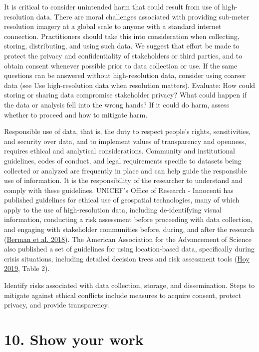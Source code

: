 \documentclass[
  12pt,
]{article}
\begin{document}
It is critical to consider unintended harm that could result from use of
high-resolution data. There are moral challenges associated with
providing sub-meter resolution imagery at a global scale to anyone with
a standard internet connection. Practitioners should take this into
consideration when collecting, storing, distributing, and using such
data. We suggest that effort be made to protect the privacy and
confidentiality of stakeholders or third parties, and to obtain consent
whenever possible prior to data collection or use. If the same questions
can be answered without high-resolution data, consider using coarser
data (see Use high-resolution data when resolution matters). Evaluate:
How could storing or sharing data compromise stakeholder privacy? What
could happen if the data or analysis fell into the wrong hands? If it
could do harm, assess whether to proceed and how to mitigate harm.

Responsible use of data, that is, the duty to respect people's rights,
sensitivities, and security over data, and to implement values of
transparency and openness, requires ethical and analytical
considerations. Community and institutional guidelines, codes of
conduct, and legal requirements specific to datasets being collected or
analyzed are frequently in place and can help guide the responsible use
of information. It is the responsibility of the researcher to understand
and comply with these guidelines. UNICEF's Office of Research -
Innocenti has published guidelines for ethical use of geospatial
technologies, many of which apply to the use of high-resolution data,
including de-identifying visual information, conducting a risk
assessment before proceeding with data collection, and engaging with
stakeholder communities before, during, and after the research
(\protect\hyperlink{ref-berman2018ethical}{Berman et al. 2018}). The
American Association for the Advancement of Science also published a set
of guidelines for using location-based data, specifically during crisis
situations, including detailed decision trees and risk assessment tools
(\protect\hyperlink{ref-hoy2019}{Hoy 2019}, Table 2).

Identify risks associated with data collection, storage, and
dissemination. Steps to mitigate against ethical conflicts include
measures to acquire consent, protect privacy, and provide transparency.

\hypertarget{show-your-work}{%
\section{10. Show your work}\label{show-your-work}}
\end{document}
